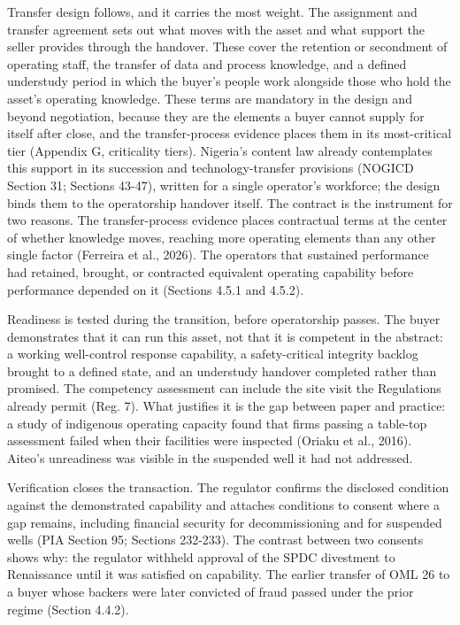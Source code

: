 \documentclass[twoside,fontset=lmodern]{mitthesis}
\begin{document}
Transfer design follows, and it carries the most weight. The assignment
and transfer agreement sets out what moves with the asset and what
support the seller provides through the handover. These cover the
retention or secondment of operating staff, the transfer of data and
process knowledge, and a defined understudy period in which the buyer's
people work alongside those who hold the asset's operating knowledge.
These terms are mandatory in the design and beyond negotiation, because
they are the elements a buyer cannot supply for itself after close, and
the transfer-process evidence places them in its most-critical tier
(Appendix G, criticality tiers). Nigeria's content law already
contemplates this support in its succession and technology-transfer
provisions (NOGICD Section 31; Sections 43-47), written for a single
operator's workforce; the design binds them to the operatorship handover
itself. The contract is the instrument for two reasons. The
transfer-process evidence places contractual terms at the center of
whether knowledge moves, reaching more operating elements than any other
single factor (Ferreira et al., 2026). The operators that sustained
performance had retained, brought, or contracted equivalent operating
capability before performance depended on it (Sections 4.5.1 and 4.5.2).

Readiness is tested during the transition, before operatorship passes.
The buyer demonstrates that it can run this asset, not that it is
competent in the abstract: a working well-control response capability, a
safety-critical integrity backlog brought to a defined state, and an
understudy handover completed rather than promised. The competency
assessment can include the site visit the Regulations already permit
(Reg. 7). What justifies it is the gap between paper and practice: a
study of indigenous operating capacity found that firms passing a
table-top assessment failed when their facilities were inspected (Oriaku
et al., 2016). Aiteo's unreadiness was visible in the suspended well it
had not addressed.

Verification closes the transaction. The regulator confirms the
disclosed condition against the demonstrated capability and attaches
conditions to consent where a gap remains, including financial security
for decommissioning and for suspended wells (PIA Section 95; Sections
232-233). The contrast between two consents shows why: the regulator
withheld approval of the SPDC divestment to Renaissance until it was
satisfied on capability. The earlier transfer of OML 26 to a buyer whose
backers were later convicted of fraud passed under the prior regime
(Section 4.4.2).
\end{document}
